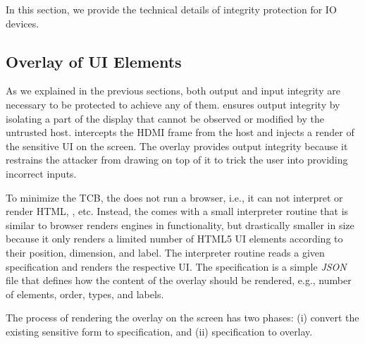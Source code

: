 In this section, we provide the technical details of \name integrity protection for IO devices. 



\subsection{\device Overlay of UI Elements}
\label{sec:systemDesign:transformation}

As we explained in the previous sections, both output and input integrity are necessary to be protected to achieve any of them. \name ensures output integrity by isolating a part of the display that cannot be observed or modified by the untrusted host. \device intercepts the HDMI frame from the host and injects a render of the sensitive UI on the screen. The overlay provides output integrity because it restrains the attacker from drawing on top of it to trick the user into providing incorrect inputs. 

To minimize the TCB, the \device does not run a browser, i.e., it can not interpret or render HTML, \js, etc. Instead, the \device comes with a small interpreter routine that is similar to browser renders engines in functionality, but drastically smaller in size because it only renders a limited number of HTML5 UI elements according to their position, dimension, and label. The interpreter routine reads a given specification and renders the respective UI. The specification is a simple \emph{JSON} file that defines how the content of the overlay should be rendered, e.g., number of elements, order, types, and labels. 

The process of rendering the overlay on the screen has two phases: (i) convert the existing sensitive form to specification, and (ii) specification to overlay.

